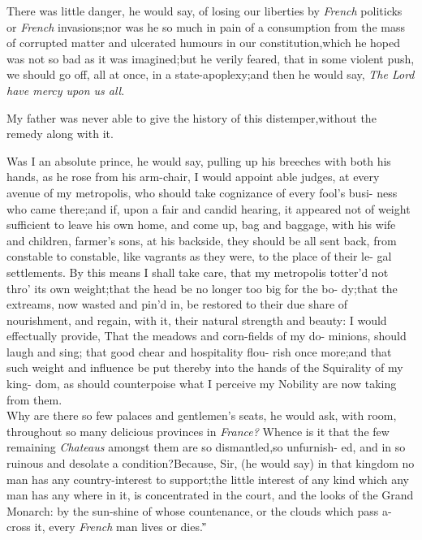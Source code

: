 \documentclass{article}
\begin{document}
There was little danger, he would say, of losing our liberties
by \textit{French} politicks or \textit{French}
invasions;\tsh  nor was he so much in pain of a consumption
from the mass of corrupted matter and ulcerated humours in our
constitution,\tsh\break which he hoped was not so bad as it was
imagined;\tsk  but he verily feared, that in some violent push, we
should go off, all at once, in a state-apoplexy;\tsk  and then he
would say, \textit{The Lord have mercy upon us all}.

My father was never able to give the history of this
distemper,\tsk  without the remedy along with it.

\indent\lqq Was I an absolute prince, he would\break
say, pulling up his breeches with both\break
his hands, as he rose from his arm-chair,\break
\lqq I would appoint able judges, at every\break
\lqq avenue of my metropolis, who should\break
\lqq take cognizance of every fool’s busi-\break
\lqq ness who came there;\tsk and if, upon\break
\lqq a fair and candid hearing, it appeared\break
\lqq not of weight sufficient to leave his\break
\lqq own home, and come up, bag and\break
\lqq baggage, with his wife and children,\break
\lqq farmer’s sons, \etc \etc at his backside,\break
\lqq they should be all sent back, from\break
\lqq constable to constable, like vagrants 
\lqq as they were, to the place of their le-\break
\lqq gal settlements. By this means I shall\break
\lqq take care, that my metropolis totter’d\break
\lqq not thro’ its own weight;\tsk  that the\break
\lqq head be no longer too big for the bo-\break
\lqq dy;\tsk  that the extreams, now wasted\break
\lqq and pin’d in, be restored to their due\break
\lqq share of nourishment, and regain, with\break
\lqq it, their natural strength and beauty:\tsk\break
\lqq I would effectually provide, That the\break
\lqq meadows and corn-fields of my do-\break
\lqq minions, should laugh and sing;\tsh\break
\lqq that good chear and hospitality flou-\break
\lqq rish once more;\tsk  and that such weight\break
\lqq and influence be put thereby into the\break
\lqq hands of the Squirality of my king-\break
\lqq dom, as should counterpoise what I\break
\lqq perceive my Nobility are now taking\break
\lqq from them.\\
\newpage
\indent\lqq Why are there so few palaces and\break
\lqq gentlemen’s seats, he would ask, with\break
{}\break
room, \lqq throughout so many delicious\break
\lqq provinces in \textit{France?} Whence is it that\break
\lqq the few remaining \textit{Chateaus} amongst\break
\lqq them are so dismantled,\tsk  so unfurnish-\break
\lqq ed, and in so ruinous and desolate a\break
\lqq condition?\tsh  Because, Sir, (he would\break
say) \lqq in that kingdom no man has any\break
\lqq country-interest to support;\tsk  the little\break
\lqq interest of any kind which any man\break
\lqq has any where in it, is concentrated in\break
\lqq the court, and the looks of the Grand\break
\lqq Monarch: by the sun-shine of whose\break
\lqq countenance, or the clouds which pass\break
\lqq a-cross it, every \textit{French} man lives or\break
\lqq dies.\.”
\end{document}
